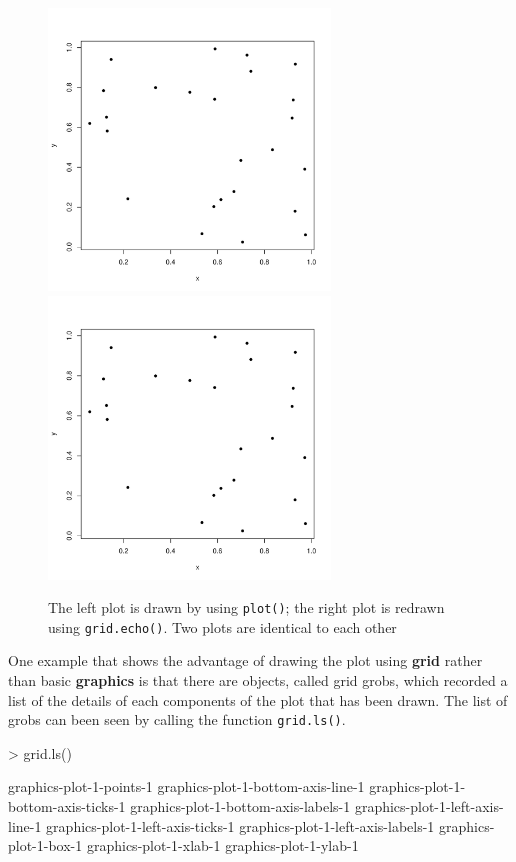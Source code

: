 \documentclass{report}
\begin{document}
\begin{figure}[h]
	\begin{center}
		\includegraphics[height = 7.5cm, width = 7.5cm]{figure/report_basic_demo_1.pdf}
		\includegraphics[height = 7.5cm, width = 7.5cm]{figure/report_basic_demo_1.pdf}
		\caption{The left plot is drawn by using \texttt{plot()}; the right plot is redrawn using \texttt{grid.echo()}. Two plots are identical to each other}
		\label{figure_1.1}
	\end{center}
\end{figure}
One example that shows the advantage of drawing the plot using \textbf{grid} rather than basic \textbf{graphics} is that there are objects, called grid grobs, which recorded a list of the details of each components of the plot that has been drawn. The list of grobs can been seen by calling the function \texttt{grid.ls()}. \\
\newpage
\begin{Schunk}
\begin{Sinput}
> grid.ls()
\end{Sinput}
\begin{Soutput}
graphics-plot-1-points-1
graphics-plot-1-bottom-axis-line-1
graphics-plot-1-bottom-axis-ticks-1
graphics-plot-1-bottom-axis-labels-1
graphics-plot-1-left-axis-line-1
graphics-plot-1-left-axis-ticks-1
graphics-plot-1-left-axis-labels-1
graphics-plot-1-box-1
graphics-plot-1-xlab-1
graphics-plot-1-ylab-1
\end{Soutput}
\end{Schunk}
\end{document}
